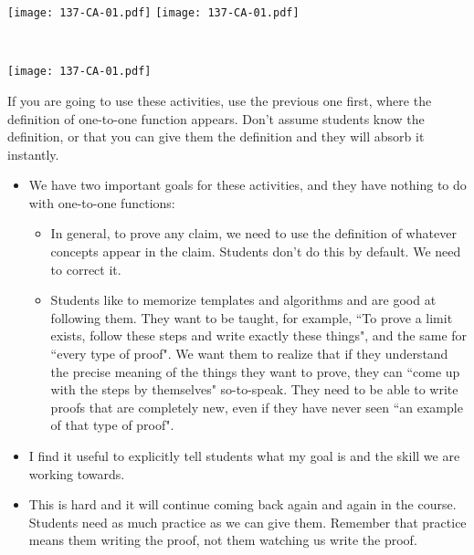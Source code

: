 \documentclass[11pt]{article}
\newcommand{\nl}{\hfill \vspace{-1.1\baselineskip}} %
\begin{document}
\begin{center}
{ \texttt{[image: 137-CA-01.pdf]}}
\quad
{ \texttt{[image: 137-CA-01.pdf]}}

\

{ \texttt{[image: 137-CA-01.pdf]}}
\end{center}

\begin{warning}
If you are going to use these activities, use the previous one first, where the definition of one-to-one function appears.  Don't assume students know the definition, or that you can give them the definition and they will absorb it instantly.
\end{warning}

\begin{comments}
\nl
\begin{itemize}
	 	\item  We have two important goals for these activities, and they have nothing to do with one-to-one functions:
		\begin{itemize}
			\item  In general, to prove any claim, we need to use the definition of whatever concepts appear in the claim.  Students don't do this by default.  We need to correct it.
			\item  Students like to memorize templates and algorithms and are good at following them.  They want to be taught, for example, ``To prove a limit exists, follow these steps and write exactly these things", and the same for ``every type of proof".  We want them to realize that if they understand the precise meaning of the things they want to prove, they can ``come up with the steps by themselves" so-to-speak.  They need to be able to write proofs that are completely new, even if they have never seen ``an example of that type of proof".
		\end{itemize}
	\item I find it useful to explicitly tell students what my goal is and the skill we are working towards.\\
	
	\item  This is hard and it will continue coming back again and again in the course.  Students need as much practice as we can give them.  Remember that practice means them writing the proof, not them watching us write the proof.
\end{itemize}
\end{comments}
\end{document}
